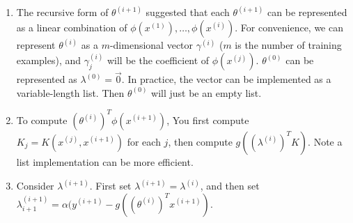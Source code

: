 \begin{answer}
    \begin{enumerate}
        \item The recursive form of $\theta^{(i+1)}$ suggested that each $\theta^{(i+1)}$ can be represented as a linear combination of $\phi(x^{(1)}), \ldots, \phi(x^{(i)})$. For convenience, we can represent $\theta^{(i)}$ as a $m$-dimensional vector $\gamma^{(i)}$ ($m$ is the number of training examples), and $\gamma^{(i)}_j$ will be the coefficient of $\phi(x^{(j)})$. $\theta^{(0)}$ can be represented as $\lambda^{(0)} = \vec{0}$.
            In practice, the vector can be implemented as a variable-length list. Then $\theta^{(0)}$ will just be an empty list.
        \item To compute $(\theta^{(i)})^T\phi(x^{(i+1)})$, You first compute $K_j = K(x^{(j)}, x^{(i+1)})$ for each $j$, then compute $g((\lambda^{(i)})^T K)$. Note a list implementation can be more efficient.
        \item Consider $\lambda^{(i+1)}$. First set $\lambda^{(i+1)} = \lambda^{(i)}$, and then set $\lambda^{(i+1)}_{i+1} = \alpha(y^{(i+1)} - g((\theta^{(i)})^Tx^{(i+1)})$. 

    \end{enumerate}
\end{answer}
